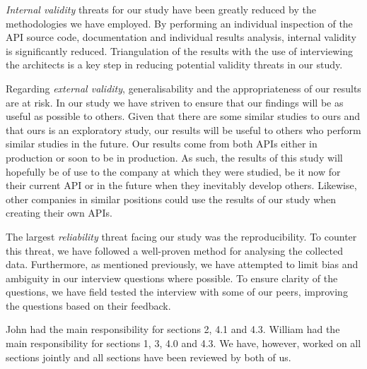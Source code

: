\documentclass[10pt,twocolumn]{article}
\begin{document}
\textit{Internal validity} threats for our study have been greatly reduced by the methodologies we have employed. By performing an individual inspection of  the API source code, documentation and individual results analysis, internal validity is significantly reduced. Triangulation of the results with the use of interviewing the architects is a key step in reducing potential validity threats in our study.

Regarding \textit{external validity}, generalisability and the appropriateness of our results are at risk. In our study we have striven to ensure that our findings will be as useful as possible to others. Given that there are some similar studies to ours and that ours is an exploratory study, our results will be useful to others who perform similar studies in the future. Our results come from both APIs either in production or soon to be in production. As such, the results of this study will hopefully be of use to the company at which they were studied, be it now for their current API or in the future when they inevitably develop others. Likewise, other companies in similar positions could use the results of our study when creating their own APIs.

The largest \textit{reliability} threat facing our study was the reproducibility. To counter this threat, we have followed a well-proven method for analysing the collected data. Furthermore, as mentioned previously, we have attempted to limit bias and ambiguity in our interview questions where possible. To ensure clarity of the questions, we have field tested the interview with some of our peers, improving the questions based on their feedback.






John had the main responsibility for sections 2, 4.1 and 4.3. William had the main responsibility for sections 1, 3, 4.0 and 4.3. We have, however, worked on all sections jointly and all sections have been reviewed by both of us. 
\end{document}
